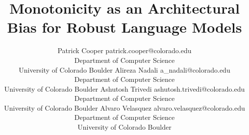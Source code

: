 \documentclass{article}
\title{Monotonicity as an Architectural Bias for Robust Language Models}
\theoremstyle{plain}
\theoremstyle{definition}
\theoremstyle{remark}
\begin{document}





\author{\name Patrick Cooper \email patrick.cooper@colorado.edu \\
      \addr Department of Computer Science\\
      University of Colorado Boulder
      \AND
      \name Alireza Nadali \email a\_nadali@colorado.edu \\
      \addr Department of Computer Science\\
      University of Colorado Boulder
      \AND
      \name Ashutosh Trivedi \email ashutosh.trivedi@colorado.edu\\
     \addr Department of Computer Science\\
      University of Colorado Boulder
       \name Alvaro Velasquez \email alvaro.velasquez@colorado.edu\\
     \addr Department of Computer Science\\
      University of Colorado Boulder}
      


\end{document}
